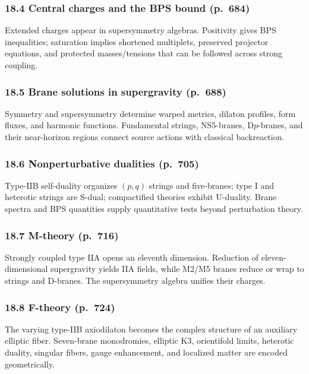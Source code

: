 \documentclass[
  10pt,
  a4paper,
  openany]{book}
\begin{document}
\subsubsection{18.4 Central charges and the BPS bound
(p.~684)}\label{central-charges-and-the-bps-bound-p.-684}

Extended charges appear in supersymmetry algebras. Positivity gives BPS
inequalities; saturation implies shortened multiplets, preserved
projector equations, and protected masses/tensions that can be followed
across strong coupling.

\subsubsection{18.5 Brane solutions in supergravity
(p.~688)}\label{brane-solutions-in-supergravity-p.-688}

Symmetry and supersymmetry determine warped metrics, dilaton profiles,
form fluxes, and harmonic functions. Fundamental strings, NS5-branes,
D\(p\)-branes, and their near-horizon regions connect source actions
with classical backreaction.

\subsubsection{18.6 Nonperturbative dualities
(p.~705)}\label{nonperturbative-dualities-p.-705}

Type-IIB self-duality organizes \((p,q)\) strings and five-branes; type
I and heterotic strings are S-dual; compactified theories exhibit
U-duality. Brane spectra and BPS quantities supply quantitative tests
beyond perturbation theory.

\subsubsection{18.7 M-theory (p.~716)}\label{m-theory-p.-716}

Strongly coupled type IIA opens an eleventh dimension. Reduction of
eleven-dimensional supergravity yields IIA fields, while M2/M5 branes
reduce or wrap to strings and D-branes. The supersymmetry algebra
unifies their charges.

\subsubsection{18.8 F-theory (p.~724)}\label{f-theory-p.-724}

The varying type-IIB axiodilaton becomes the complex structure of an
auxiliary elliptic fiber. Seven-brane monodromies, elliptic K3,
orientifold limits, heterotic duality, singular fibers, gauge
enhancement, and localized matter are encoded geometrically.
\end{document}
